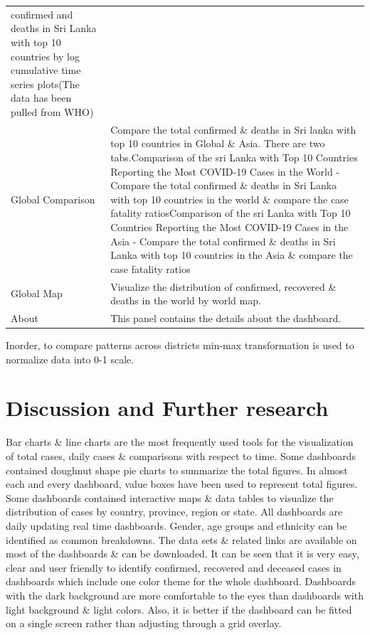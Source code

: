 \documentclass[
]{article}
\begin{document}
\begin{longtable}[]{@{}
  >{\raggedright\arraybackslash}p{}
  >{\raggedright\arraybackslash}p{}@{}}
confirmed and deaths in Sri Lanka with top 10 countries by log
cumulative time series plots\hfill\break (The data has been pulled from
WHO)\hfill\break \\
Global Comparison & Compare the total confirmed \& deaths in Sri lanka
with top 10 countries in Global \& Asia. There are two
tabs.\hfill\break * Comparison of the sri Lanka with Top 10 Countries
Reporting the Most COVID-19 Cases in the World - Compare the total
confirmed \& deaths in Sri Lanka with top 10 countries in the world \&
compare the case fatality ratios\hfill\break * Comparison of the sri
Lanka with Top 10 Countries Reporting the Most COVID-19 Cases in the
Asia - Compare the total confirmed \& deaths in Sri Lanka with top 10
countries in the Asia \& compare the case fatality ratios\hfill\break \\
Global Map & Visualize the distribution of confirmed, recovered \&
deaths in the world by world map.\hfill\break \\
About & This panel contains the details about the dashboard. \\
\bottomrule
\end{longtable}

Inorder, to compare patterns across districts min-max transformation is
used to normalize data into 0-1 scale.

\hypertarget{discussion-and-further-research}{%
\section{Discussion and Further
research}\label{discussion-and-further-research}}

Bar charts \& line charts are the most frequently used tools for the
visualization of total cases, daily cases \& comparisons with respect to
time. Some dashboards contained doughnut shape pie charts to summarize
the total figures. In almost each and every dashboard, value boxes have
been used to represent total figures. Some dashboards contained
interactive maps \& data tables to visualize the distribution of cases
by country, province, region or state. All dashboards are daily updating
real time dashboards. Gender, age groups and ethnicity can be identified
as common breakdowns. The data sets \& related links are available on
most of the dashboards \& can be downloaded. It can be seen that it is
very easy, clear and user friendly to identify confirmed, recovered and
deceased cases in dashboards which include one color theme for the whole
dashboard. Dashboards with the dark background are more comfortable to
the eyes than dashboards with light background \& light colors. Also, it
is better if the dashboard can be fitted on a single screen rather than
adjusting through a grid overlay.
\end{document}
